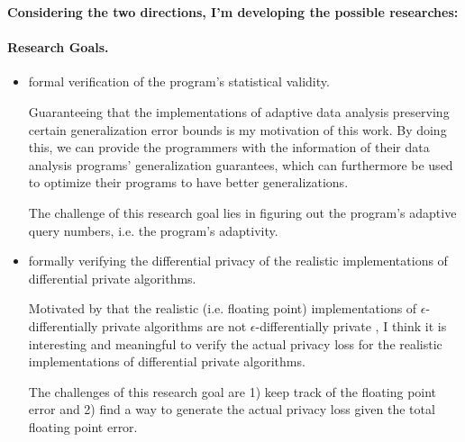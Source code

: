 \documentclass{article}
\begin{document}




\textbf{Considering the two directions, I'm developing the possible researches:}

\paragraph{Research Goals.}
\begin{itemize}
	\item formal verification of the program's statistical validity.

	Guaranteeing that the implementations of adaptive data analysis preserving certain generalization error bounds is my motivation of this work.
	By doing this, we can provide the programmers with the information of their data analysis programs' generalization guarantees,
	which can furthermore be used to optimize their programs to have better generalizations.

	The challenge of this research goal lies in figuring out the program's adaptive query numbers, i.e. the program's adaptivity.

	\item formally verifying the differential privacy of the realistic implementations of differential private algorithms.

	Motivated by that the realistic (i.e. floating point) implementations of $\epsilon$-differentially private algorithms are not $\epsilon$-differentially private \cite{Mironov2012on}, I think it is interesting and meaningful to verify the actual privacy loss for the realistic implementations of differential private algorithms.

	The challenges of this research goal are 1) keep track of the floating point error and 2) find a way to generate the actual privacy loss given the total floating point error.

\end{itemize}  
\end{document}
